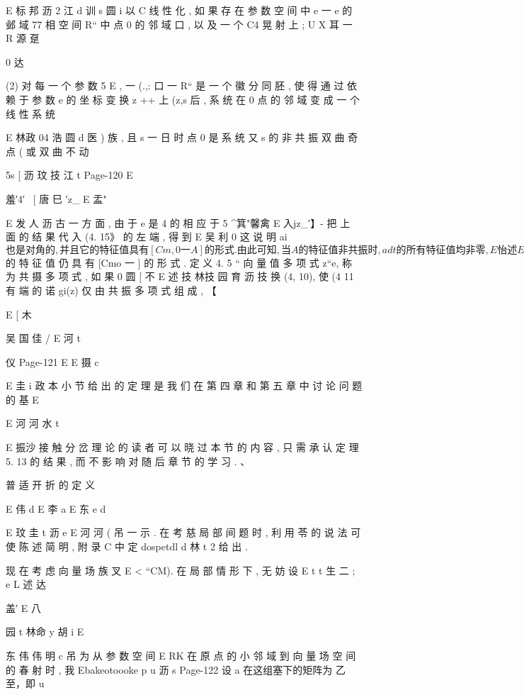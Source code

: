 {{E 标 邦 沥 2 江 d 训 s
圆
i
以 C 线 性 化 , 如 果 存 在 参 数 空 间 中 e 一 e 的 邺 域 77 相 空 间 R“ 中
点 0 的 邻 域 口 , 以 及 一 个 C4 晃 射 上 ; U X 耳 一 R 源 趸

0 达

(2) 对 每 一 个 参 数 5 E , 一 (.,: 口 一 R“ 是 一 个 徽 分 同 胚 ,
使 得 通 过 依 赖 于 参 数 e 的 坐 标 变 换 z ++ 上 (z,s 后 , 系 统 在 0 点 的
邻 域 变 成 一 个 线 性 系 统

E 林政 04 浩 圆 d
医 ) 族 , 且 s 一 日 时 点 0 是 系 统 又 s 的 非 共 振 双 曲 奇 点 ( 或 双 曲 不 动

5s
[ 沥 玟 技 江
t
Page-120
E

羞′4′~ [ 唐 巳 ′z_ E 盂"

E 发 人 沥
古 一 方 面 , 由 于 e 是 4 的 相 应 于 %
5 ^箕"馨禽 E 入jz_′】-
把 上 面 的 结 果 代 入 (4. 15》 的 左 端 , 得 到
E 吴 利 0
这 说 明 ai$ 也 是 对 角 的 , 并 且 它 的 特 征 值 具 有 [Cm,0 一 A] 的 形
式 . 由 此 可 知 , 当 A 的 特 征 值 非 共 振 时 ,adt 的 所 有 特 征 值 均 非 零 ,
E 怡 述
E a
ad 也 有 相 应 的 Jordan 坡 , 并 且 ad$ 的 特 征 值 仍 具 有 [Cmo 一 ]
的 形 式 .
定 义 4. 5 “ 向 量 值 多 项 式 z“e, 称 为 共 摄 多 项 式 , 如 果
0 圆 [ 不
E 述
技
林技 园 育 沥 技
换 (4, 10), 使 (4 11 有 端 的 诺 gi(z) 仅 由 共 振 多 项 式 组 成 , 【

E
[ 木

吴 国
佳 /
E 河 t

仪
Page-121
E E 摄 c

E 圭 i 政
本 小 节 给 出 的 定 理 是 我 们 在 第 四 章 和 第 五 章 中 讨 论 问 题 的 基
E

E 河 河 水 t

E 振沙
接 触 分 岔 理 论 的 读 者 可 以 晓 过 本 节 的 内 容 , 只 需 承 认 定 理 5. 13 的
结 果 , 而 不 影 响 对 随 后 章 节 的 学 习 . 、

普 适 开 折 的 定 义

E 伟 d
E 李 a
E 东 e d

E 玟 圭 t 沥 e
E 河 河 ( 吊 一
示 . 在 考 慈 局 部 间 题 时 , 利 用 苓 的 说 法 可 使 陈 述 简 明 , 附 录 C 中 定
dospetdl d 林 t 2
给 出 .

现 在 考 虑 向 量 场 族 叉 E < “CM). 在 局 部 情 形 下 , 无 妨 设
E t t 生 二 ; e
L 述 达

盖′ E 八

园 t 林命 y 胡 i
E

东 伟 伟 明 c 吊
为 从 参 数 空 间 E RK 在 原 点 的 小 邻 域 到 向 量 场 空 间 的 春 射 时 , 我
Ebakeotoooke p u 沥 s
Page-122
设 a 在这组塞下的矩阵为 乙至，即
u

}}
